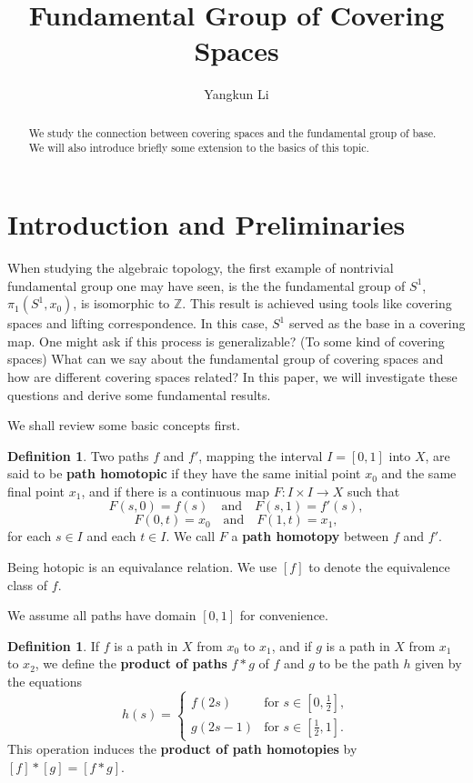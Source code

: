 \documentclass{amsart}
\theoremstyle{definition}
\newtheorem{definition}[theorem]{Definition}
\theoremstyle{remark}
\numberwithin{equation}{section}
\begin{document}
\title{Fundamental Group of Covering Spaces}

\author{Yangkun Li}
\begin{abstract}We study the connection between covering spaces and the fundamental group of base.  We will also introduce briefly some extension to the basics of this topic.\end{abstract}
\maketitle 
\section{Introduction and Preliminaries}
\noindent When studying the algebraic topology, the first example of nontrivial fundamental group one may have seen, is the the fundamental group of $S^1$, $\pi_1(S^1, x_0)$, is isomorphic to $\mathbb{Z}$. This result is achieved using tools like covering spaces and lifting correspondence. In this case, $S^1$ served as the base in a covering map. One might ask if this process is generalizable? (To some kind of covering spaces) What can we say about the fundamental group of covering spaces and how are different covering spaces related? In this paper, we will investigate these questions and derive some fundamental results.

We shall review some basic concepts first.

\begin{definition} Two paths $f$ and $f'$, mapping the interval $I = [0, 1]$ into $X$, are said to be \textbf{path homotopic} if they have the same initial point $x_0$ and the same final point $x_1$, and if there is a continuous map $F : I \times I \to X$ such that
\[
F(s, 0) = f(s) \quad \text{and} \quad F(s, 1) = f'(s),
\]
\[
F(0, t) = x_0 \quad \text{and} \quad F(1, t) = x_1,
\]
for each $s \in I$ and each $t \in I$. We call $F$ a \textbf{path homotopy} between $f$ and $f'$.

\noindent Being hotopic is an equivalance relation. We use $[f]$ to denote the equivalence class of $f$.

\noindent We assume all paths have domain $[0,1]$ for convenience.
\end{definition}

\begin{definition}If $f$ is a path in $X$ from $x_0$ to $x_1$, and if $g$ is a path in $X$ from $x_1$ to $x_2$, we define the \textbf{product of paths} $f \ast g$ of $f$ and $g$ to be the path $h$ given by the equations
\[
h(s) =
\begin{cases} 
f(2s) & \text{for } s \in \left[0, \frac{1}{2}\right], \\
g(2s - 1) & \text{for } s \in \left[\frac{1}{2}, 1\right].
\end{cases}
\]
This operation induces the \textbf{product of path homotopies} by $[f] \ast [g] = [f \ast g]$.
\end{definition}
\end{document}
